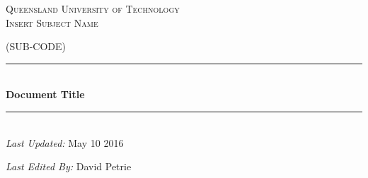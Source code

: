 \begin{titlepage}

\newcommand{\HRule}{\rule{\linewidth}{0.5mm}} %

\begin{center}

\textsc{\LARGE Queensland University of Technology}\\[1.0cm] %
\textsc{\Large Insert Subject Name}

\textsc{\Large (SUB-CODE)}\\[1.0cm]


\HRule \\[0.4cm]
{ \huge \bfseries Document Title}\\{} %
\HRule \\[1.5cm]

\textit{Last Updated:} May 10 2016 


\textit{Last Edited By:} David Petrie

\end{center}

\vfill %

\end{titlepage}

\newpage